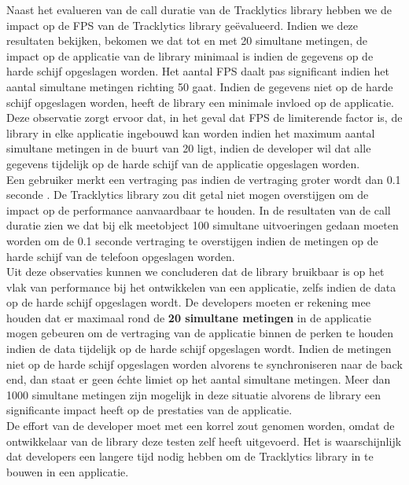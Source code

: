 Naast het evalueren van de call duratie van de Tracklytics library hebben we de impact op de FPS van de Tracklytics library ge\"evalueerd. Indien we deze resultaten bekijken, bekomen we dat tot en met 20 simultane metingen, de impact op de applicatie van de library minimaal is indien de gegevens op de harde schijf opgeslagen worden. Het aantal FPS daalt pas significant indien het aantal simultane metingen richting 50 gaat. Indien de gegevens niet op de harde schijf opgeslagen worden, heeft de library een minimale invloed op de applicatie. Deze observatie zorgt ervoor dat, in het geval dat FPS de limiterende factor is, de library in elke applicatie ingebouwd kan worden indien het maximum aantal simultane metingen in de buurt van 20 ligt, indien de developer wil dat alle gegevens tijdelijk op de harde schijf van de applicatie opgeslagen worden. \\ 

Een gebruiker merkt een vertraging pas indien de vertraging groter wordt dan 0.1 seconde \cite{nielsen1994usability}. De Tracklytics library zou dit getal niet mogen overstijgen om de impact op de performance aanvaardbaar te houden. In de resultaten van de call duratie zien we dat bij elk meetobject 100 simultane uitvoeringen gedaan moeten worden om de 0.1 seconde vertraging te overstijgen indien de metingen op de harde schijf van de telefoon opgeslagen worden. \\


Uit deze observaties kunnen we concluderen dat de library bruikbaar is op het vlak van performance bij het ontwikkelen van een applicatie, zelfs indien de data op de harde schijf opgeslagen wordt. De developers moeten er rekening mee houden dat er maximaal rond de \textbf{20 simultane metingen} in de applicatie mogen gebeuren om de vertraging van de applicatie binnen de perken te houden indien de data tijdelijk op de harde schijf opgeslagen wordt. Indien de metingen niet op de harde schijf opgeslagen worden alvorens te synchroniseren naar de back end, dan staat er geen \'echte limiet op het aantal simultane metingen. Meer dan 1000 simultane metingen zijn mogelijk in deze situatie alvorens de library een significante impact heeft op de prestaties van de applicatie. \\

De effort van de developer moet met een korrel zout genomen worden, omdat de ontwikkelaar van de library deze testen zelf heeft uitgevoerd. Het is waarschijnlijk dat developers een langere tijd nodig hebben om de Tracklytics library in te bouwen in een applicatie. \\












